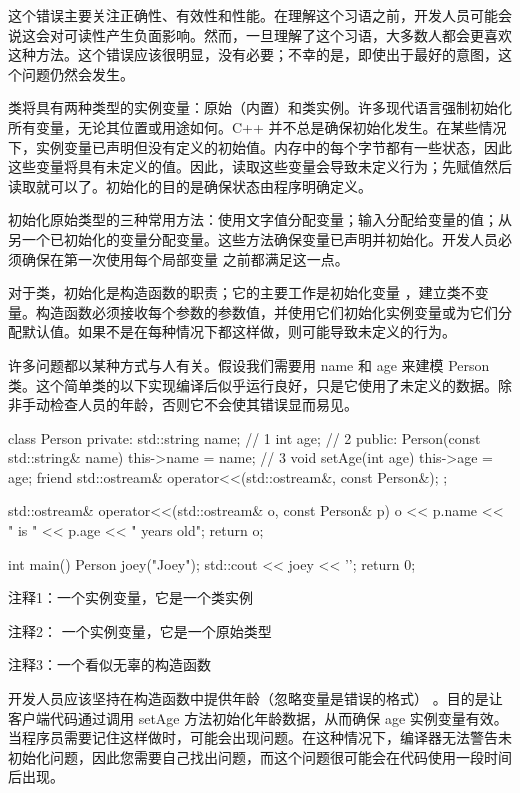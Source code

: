 这个错误主要关注正确性、有效性和性能。在理解这个习语之前，开发人员可能会说这会对可读性产生负面影响。然而，一旦理解了这个习语，大多数人都会更喜欢这种方法。这个错误应该很明显，没有必要；不幸的是，即使出于最好的意图，这个问题仍然会发生。

类将具有两种类型的实例变量：原始（内置）和类实例。许多现代语言强制初始化所有变量，无论其位置或用途如何。C++ 并不总是确保初始化发生。在某些情况下，实例变量已声明但没有定义的初始值。内存中的每个字节都有一些状态，因此这些变量将具有未定义的值。因此，读取这些变量会导致未定义行为；先赋值然后读取就可以了。初始化的目的是确保状态由程序明确定义。

初始化原始类型的三种常用方法：使用文字值分配变量；输入分配给变量的值；从另一个已初始化的变量分配变量。这些方法确保变量已声明并初始化。开发人员必须确保在第一次使用每个局部变量 之前都满足这一点。

对于类，初始化是构造函数的职责；它的主要工作是初始化变量 ，建立类不变量。构造函数必须接收每个参数的参数值，并使用它们初始化实例变量或为它们分配默认值。如果不是在每种情况下都这样做，则可能导致未定义的行为。


许多问题都以某种方式与人有关。假设我们需要用 name 和 age 来建模 Person 类。这个简单类的以下实现编译后似乎运行良好，只是它使用了未定义的数据。除非手动检查人员的年龄，否则它不会使其错误显而易见。


\begin{cpp}
class Person {
private:
  std::string name; // 1
  int age; // 2
public:
  Person(const std::string& name) { this->name = name; } // 3
  void setAge(int age) { this->age = age; }
  friend std::ostream& operator<<(std::ostream&, const Person&);
};

std::ostream& operator<<(std::ostream& o, const Person& p) {
  o << p.name << " is " << p.age << " years old";
  return o;
}

int main() {
  Person joey("Joey");
  std::cout << joey << '\n';
  return 0;
}
\end{cpp}

{\footnotesize
注释1：一个实例变量，它是一个类实例

注释2： 一个实例变量，它是一个原始类型

注释3：一个看似无辜的构造函数
}

开发人员应该坚持在构造函数中提供年龄（忽略变量是错误的格式） 。目的是让客户端代码通过调用 setAge 方法初始化年龄数据，从而确保 age 实例变量有效。当程序员需要记住这样做时，可能会出现问题。在这种情况下，编译器无法警告未初始化问题，因此您需要自己找出问题，而这个问题很可能会在代码使用一段时间后出现。

